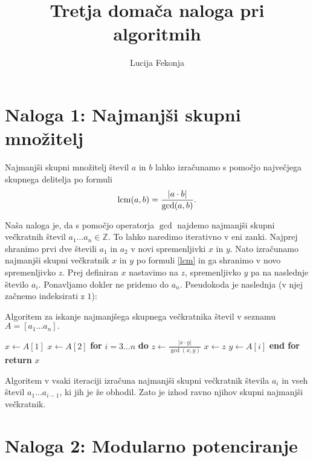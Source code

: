 \documentclass[fleqn]{article}
\title{Tretja domača naloga pri algoritmih}
\author{Lucija Fekonja}
\DeclareMathOperator{\lcm}{lcm}
\begin{document}
\maketitle

\section*{Naloga 1: Najmanjši skupni množitelj}
Najmanjši skupni množitelj števil $a$ in $b$ lahko izračunamo s pomočjo največjega skupnega delitelja po formuli 
\begin{equation}
    \label{lcm}
    \centering
    \lcm (a, b) = \frac{| a \cdot b |}{\gcd(a, b)} \text{.}
\end{equation}

Naša naloga je, da s pomočjo operatorja $\gcd$ najdemo najmanjši skupni večkratnih števil $a_1 \dots a_n \in \mathbb{Z}$. To lahko naredimo iterativno v eni zanki.
Najprej shranimo prvi dve števili $a_1$ in $a_2$ v novi spremenljivki $x$ in $y$. Nato izračunamo najmanjši skupni večkratnik $x$ in $y$ po formuli \eqref{lcm} in ga shranimo v novo spremenljivko $z$.
Prej definiran $x$ nastavimo na $z$, spremenljivko $y$ pa na naslednje število $a_i$. Ponavljamo dokler ne pridemo do $a_n$. Pseudokoda je naslednja (v njej začnemo indeksirati z $1$):
\begin{algorithm}
    \caption{Algoritem za iskanje najmanjšega skupnega večkratnika števil v seznamu $A = [a_1 \dots a_n]\text{.}$}
    \begin{algorithmic}
            \State $x \leftarrow A[1]$
            \State $x \leftarrow A[2]$
            \State \textbf{for} $i = 3 \dots n$ \textbf{do}
            \State \qquad $z \leftarrow \frac{| x \cdot y |}{\gcd (x, y)}$  
            \State \qquad $x \leftarrow z$
            \State \qquad $y \leftarrow A[i]$
            \State \textbf{end for}
            \State \textbf{return} $x$
        \EndProcedure
        \end{algorithmic}    
\end{algorithm}

Algoritem v vsaki iteraciji izračuna najmanjši skupni večkratnik števila $a_i$ in vseh števil $a_1 \dots a_{i-1}$, ki jih je že obhodil.
Zato je izhod ravno njihov skupni najmanjši večkratnik.

\pagebreak

\section*{Naloga 2: Modularno potenciranje}
\end{document}
